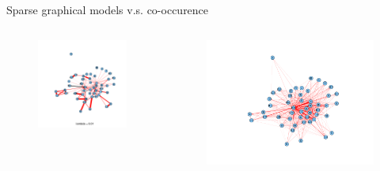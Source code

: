 \documentclass[12pt, trans]{beamer}
\newcommand{\1}[1]{{\mathbf 1}\left\{#1\right\}}        %
\begin{document}
\begin{frame}{Sparse graphical models v.s. co-occurence}

 \begin{columns}[t]
 \begin{column}{0.5\textwidth}

\begin{figure}
  \centering
  \includegraphics[scale=0.25]{./../../gLassoResults/glasso1.png} 
\end{figure}

 \end{column}
 \begin{column}{0.5\textwidth}

\begin{figure}
  \centering
  \includegraphics[scale=0.25]{./../../coocurResults/cooccurNetwork.png} 
\end{figure}

 \end{column}
 \end{columns}

\end{frame}
\end{document}
